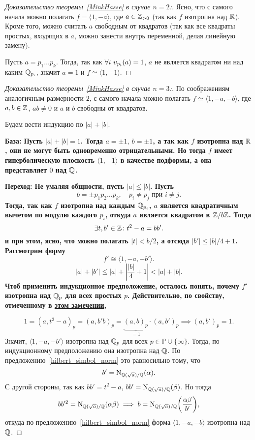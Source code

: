 	\begin{proof}[Доказательство теоремы~\ref{MinkHasse} в случае $n = 2$:]
		Ясно, что с самого начала можно полагать $f = \langle 1, -a \rangle$, где $a \in \mathbb{Z}_{>0}$ (так как $f$ изотропна над $\mathbb{R}$). Кроме того, можно считать $a$ свободным от квадратов (так как все квадраты простых, входящих в $a$, можно занести внутрь переменной, делая линейную замену).

		 Пусть $a = p_1 \ldots p_k$. Тогда, так как $\forall i \ \upsilon_{p_i}(a) = 1$, $a$ не является квадратом ни над каким $\mathbb{Q}_{p_i}$, значит $a = 1$ и $f \simeq \langle 1, - 1\rangle$.
	\end{proof}
	\begin{proof}[Доказательство теоремы~\ref{MinkHasse} в случае $n = 3$:]
		По соображениям аналогичным размерности $2$, с самого начала можно полагать $f \simeq \langle 1, -a, -b \rangle$, где  $a, b \in \mathbb{Z}$, $ab \neq 0$ и $a$ и $b$ свободны от квадратов. 

		Будем вести индукцию по $|a| + |b|$.

		\bf{База:} Пусть $|a| + |b| = 1$. Тогда $a = \pm 1, \ b = \pm 1$, а так как $f$ изотропна над $\mathbb{R}$, они не могут быть одновременно отрицательными. Но тогда $f$ имеет гиперболическую плоскость $\langle 1, -1 \rangle$ в качестве подформы, а она представляет $0$ над $\mathbb{Q}$. 

		\bf{Переход:} Не умаляя общности, пусть $|a| \le |b|$. Пусть
		\[
			b = \pm p_1 p_2 \ldots p_k, \quad p_i \neq p_j \text{ при } i \neq j.
		\]
		Тогда, так как $f$ изотропна над каждым $\mathbb{Q}_{p_i}$, $a$ является квадратичным вычетом по модулю каждого $p_i$, откуда $a$ является квадратом в $\mathbb{Z}/b\mathbb{Z}$. Тогда 
		\[
			\exists t, b'\in \mathbb{Z}\colon t^2 - a = b b'.
		\]
		и при этом, ясно, что можно полагать $|t| < b/2$, а отсюда $|b'| \le |b|/4 + 1$. Рассмотрим форму 
		\[
			f' \cong \langle 1, -a, -b' \rangle. 
		\]
		\[
			|a| + |b'| \le |a| + \left\lvert \frac{|b|}{4} + 1\right\rvert < |a| + |b|.
		\]
		Чтоб применить индукционное предположение, осталось понять, почему $f'$ изотропна над $\mathbb{Q}_{p}$ для всех простых $p$. Действительно, по свойству, отмеченному в \hyperlink{(1 - a, a)_p}{
		этом замечении}, 

		\[
			1 = (a, t^2 - a)_{p} = (a, b'b)_{p} = \underbrace{(a, b)_{p}}_{= 1} \cdot (a, b')_{p} \implies (a, b')_{p} = 1.
		\]
		Значит, $\langle 1, -a, -b' \rangle$ изотропна над $\mathbb{Q}_{p}$ для всех $p \in \mathbb{P} \cup \{ \infty \}$. Тогда, по индукционному предположению она изотропна над $\mathbb{Q}$. По предложению~\ref{hilbert_simbol_norm} это равносильно тому, что
		\[
			b' = \operatorname{\mathrm{N}}_{\mathbb{Q}(\sqrt{a})/\mathbb{Q}}(\alpha).
		\]
		С другой стороны, так как $b b' = t^2 - a$, $b b' = \operatorname{\mathrm{N}}_{\mathbb{Q}(\sqrt{a})/\mathbb{Q}}(\beta)$. Но тогда 
		\[
			b b'^2 = \Nm_{\Q(\sqrt{a})/\Q}(\alpha \beta) \implies b = \Nm_{\Q(\sqrt{a})/\Q}\lr*{\frac{\alpha \beta}{b'}}, 
		\]
		откуда по предложению~\ref{hilbert_simbol_norm} форма $\langle 1, -a, -b \rangle$ изотропна над $\mathbb{Q}$.
	\end{proof}
